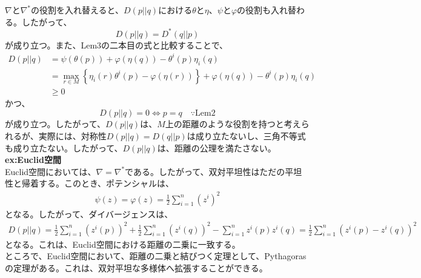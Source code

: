 \documentclass[a4paper,11pt]{jsarticle}
\numberwithin{equation}{section}
\begin{document}
    $\nabla$と$\nabla^*$の役割を入れ替えると、$D(p||q)$における$\theta$と$\eta$、$\psi$と$\varphi$の役割も入れ替わる。したがって、
    \begin{equation}
        D(p||q) = D^*(q||p)
    \end{equation}
    が成り立つ。また、Lem3の二本目の式と比較することで、
    \begin{align}
        D(p||q) &= \psi(\theta(p)) + \varphi(\eta(q)) - \theta^i(p)\eta_i(q) \\
        &= \underset{r \in M}{\max} \left\{ \eta_i(r)\theta^i(p) - \varphi(\eta(r)) \right\} + \varphi(\eta(q)) - \theta^i(p)\eta_i(q) \\
        &\geq 0
    \end{align}
    かつ、
    \begin{equation}
        D(p||q) = 0 \Leftrightarrow p = q \quad \because \text{Lem2}
    \end{equation}
    が成り立つ。したがって、$D(p||q)$は、$M$上の距離のような役割を持つと考えられるが、実際には、対称性$D(p||q) = D(q||p)$は成り立たないし、三角不等式も成り立たない。したがって、$D(p||q)$は、距離の公理を満たさない。\\
    
    \textbf{ex:Euclid空間}\\
    Euclid空間においては、$\nabla = \nabla^*$である。したがって、双対平坦性はただの平坦性と帰着する。このとき、ポテンシャルは、
    \begin{align}
        \psi(z) = \varphi(z) = \frac{1}{2}\sum_{i=1}^{n} (z^i)^2
    \end{align}
    となる。したがって、ダイバージェンスは、
    \begin{align}
        D(p||q) = \frac{1}{2}\sum_{i=1}^{n} (z^i(p))^2 + \frac{1}{2}\sum_{i=1}^{n} (z^i(q))^2 - \sum_{i=1}^{n} z^i(p)z^i(q) = \frac{1}{2}\sum_{i=1}^{n} (z^i(p) - z^i(q))^2
    \end{align}
    となる。これは、Euclid空間における距離の二乗に一致する。\\
    ところで、Euclid空間において、距離の二乗と結びつく定理として、Pythagorasの定理がある。これは、双対平坦な多様体へ拡張することができる。
    
\end{document}
